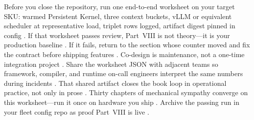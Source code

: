 Before you close the repository, run one end-to-end worksheet on your target SKU: warmed Persistent Kernel, three context buckets, vLLM or equivalent scheduler at representative load, triplet rows logged, artifact digest pinned in config \citep{kwon2023vllm,yirage2026,chen2020compilerbasedhardw,patel2025llminference,taxbreak2026,memoryfloor2026,nvidia2024cudagraphs,dao2022flashattention,dlbook}. If that worksheet passes review, Part~VIII is not theory---it is your production baseline \citep{patel2025llminference,yirage2026,chen2020compilerbasedhardw,kwon2023vllm,dlbook}. If it fails, return to the section whose counter moved and fix the contract before shipping features \citep{patel2025llminference,yirage2026,chen2020compilerbasedhardw,taxbreak2026,memoryfloor2026,dlbook}. Co-design is maintenance, not a one-time integration project \citep{patel2025llminference,yirage2026,chen2020compilerbasedhardw,kwon2023vllm,dlbook}. Share the worksheet JSON with adjacent teams so framework, compiler, and runtime on-call engineers interpret the same numbers during incidents \citep{patel2025llminference,yirage2026,chen2020compilerbasedhardw,kwon2023vllm,taxbreak2026,memoryfloor2026,dlbook}. That shared artifact closes the book loop in operational practice, not only in prose \citep{patel2025llminference,yirage2026,chen2020compilerbasedhardw,dlbook}. Thirty chapters of mechanical sympathy converge on this worksheet---run it once on hardware you ship \citep{patel2025llminference,taxbreak2026,memoryfloor2026,yirage2026,chen2020compilerbasedhardw,kwon2023vllm,dlbook}. Archive the passing run in your fleet config repo as proof Part~VIII is live \citep{patel2025llminference,yirage2026,chen2020compilerbasedhardw,dlbook}.

